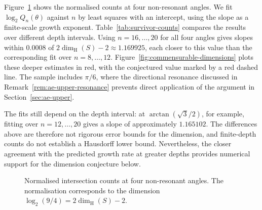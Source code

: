 \documentclass[scheme=plain]{ctexart}
\newcommand{\dimhaus}{\dim_\mathrm{H}}
\begin{document}
Figure~\ref{fig:survivor-counts} shows the normalised counts at four non-resonant angles.
We fit $\log_2Q_n(\theta)$ against $n$ by least squares with an intercept, using the slope as a finite-scale growth exponent.
Table~\ref{tab:survivor-counts} compares the results over different depth intervals.
Using $n=16,\ldots,20$ for all four angles gives slopes within $0.0008$ of $2\dimhaus(S)-2\approx1.169925$, each closer to this value than the corresponding fit over $n=8,\ldots,12$.
Figure~\ref{fig:commensurable-dimensions} plots these deeper estimates in red, with the conjectured value marked by a red dashed line.
The sample includes $\pi/6$, where the directional resonance discussed in Remark~\ref{rem:ae-upper-resonance} prevents direct application of the argument in Section~\ref{sec:ae-upper}.

The fits still depend on the depth interval: at $\arctan(\sqrt3/2)$, for example, fitting over $n=12,\ldots,20$ gives a slope of approximately $1.165102$.
The differences above are therefore not rigorous error bounds for the dimension, and finite-depth counts do not establish a Hausdorff lower bound.
Nevertheless, the closer agreement with the predicted growth rate at greater depths provides numerical support for the dimension conjecture below.

\begin{figure}[H]
\centering
{}
\caption{Normalised intersection counts at four non-resonant angles.
The normalisation corresponds to the dimension $\log_2(9/4)=2\dimhaus(S)-2$.}
\label{fig:survivor-counts}
\end{figure}
\end{document}
